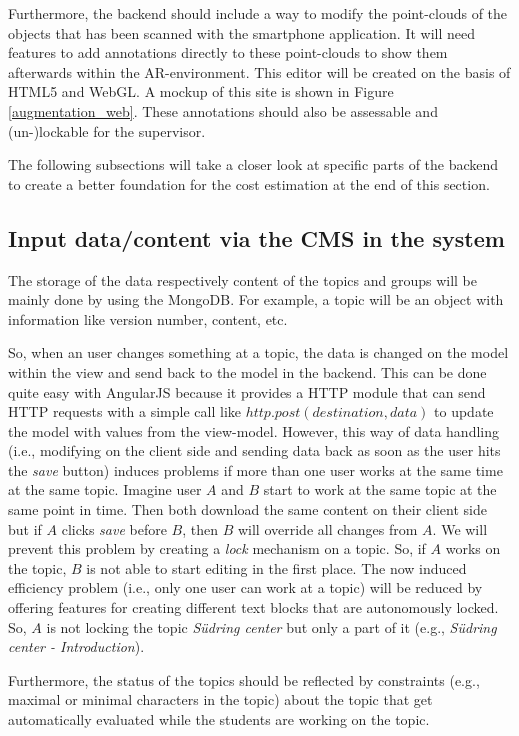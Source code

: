 Furthermore, the backend should include a way to modify the point-clouds of the objects that has been scanned with the smartphone application. It will need features to add annotations directly to these point-clouds to show them afterwards within the \ac{AR}-environment. This editor will be created on the basis of \ac{HTML5} and \ac{WebGL}. A mockup of this site is shown in Figure \ref{augmentation_web}. These annotations should also be assessable and (un-)lockable for the supervisor. 

The following subsections will take a closer look at specific parts of the backend to create a better foundation for the cost estimation at the end of this section. 

\subsection{Input data/content via the \ac{CMS} in the system}
The storage of the data respectively content of the topics and groups will be mainly done by using the MongoDB. For example, a topic will be an object with information like version number, content, etc. 

So, when an user changes something at a topic, the data is changed on the model within the view and send back to the model in the backend. This can be done quite easy with AngularJS because it provides a \ac{HTTP} module that can send \ac{HTTP} requests with a simple call like $http.post(destination,data)$ to update the model with values from the view-model. However, this way of data handling (i.e., modifying on the client side and sending data back as soon as the user hits the \emph{save} button) induces problems if more than one user works at the same time at the same topic. Imagine user $A$ and $B$ start to work at the same topic at the same point in time. Then both download the same content on their client side but if $A$ clicks \emph{save} before $B$, then $B$ will override all changes from $A$. We will prevent this problem by creating a \emph{lock} mechanism on a topic. So, if $A$ works on the topic, $B$ is not able to start editing in the first place. The now induced efficiency problem (i.e., only one user can work at a topic) will be reduced by offering features for creating different text blocks that are autonomously locked. So, $A$ is not locking the topic \emph{S\"udring center} but only a part of it (e.g., \emph{S\"udring center - Introduction}).

Furthermore, the status of the topics should be reflected by constraints (e.g., maximal or minimal characters in the topic) about the topic that get automatically evaluated while the students are working on the topic. 

